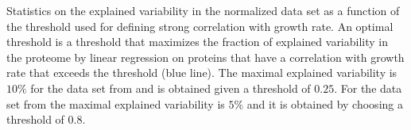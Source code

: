 \label{fig:threshold}
  Statistics on the explained variability in the normalized data set as a function of the threshold used for defining strong correlation with growth rate.
  An optimal threshold is a threshold that maximizes the fraction of explained variability in the proteome by linear regression on proteins that have a correlation with growth rate that exceeds the threshold (blue line).
  The maximal explained variability is $10\%$ for the data set from \cite{Heinemann2015} and is obtained given a threshold of $0.25$.
  For the data set from \cite{Valgepea2013} the maximal explained variability is $5\%$ and it is obtained by choosing a threshold of $0.8$.
